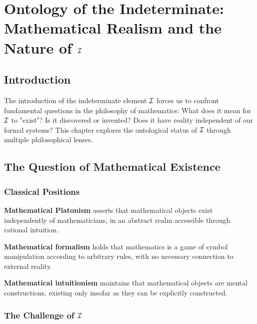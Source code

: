 \chapter{Ontology of the Indeterminate: Mathematical Realism and the Nature of $\mathcal{I}$}
\label{ch:ontology}

\section{Introduction}

The introduction of the indeterminate element $\mathcal{I}$ forces us to confront fundamental questions in the philosophy of mathematics: What does it mean for $\mathcal{I}$ to "exist"? Is it discovered or invented? Does it have reality independent of our formal systems? This chapter explores the ontological status of $\mathcal{I}$ through multiple philosophical lenses.

\section{The Question of Mathematical Existence}

\subsection{Classical Positions}

\begin{definition}[Platonism]
\textbf{Mathematical Platonism} asserts that mathematical objects exist independently of mathematicians, in an abstract realm accessible through rational intuition.
\end{definition}

\begin{definition}[Formalism]
\textbf{Mathematical formalism} holds that mathematics is a game of symbol manipulation according to arbitrary rules, with no necessary connection to external reality.
\end{definition}

\begin{definition}[Intuitionism]
\textbf{Mathematical intuitionism} maintains that mathematical objects are mental constructions, existing only insofar as they can be explicitly constructed.
\end{definition}

\subsection{The Challenge of $\mathcal{I}$}

